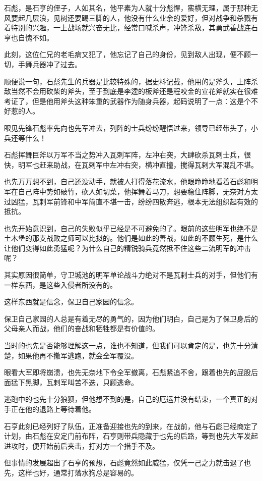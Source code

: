 \begin{multicols}{\theparacolNo}
石彪，是石亨的侄子，人如其名，他平素为人就十分彪悍，蛮横无理，属于那种无风要起几层浪，见树还要踢三脚的人，他没有什么业余的爱好，但对战争和杀戮有着特别的兴趣，一上战场就兴奋无比，经常口喊杀声，冲锋杀敌，其勇武善战连石亨也自愧不如。

此刻，这位仁兄的老毛病又犯了，他忘记了自己的身份，见到敌人出现，便不顾一切，手舞兵器冲了过去。

顺便说一句，石彪先生的兵器是比较特殊的，据史料记载，他用的是斧头，上阵杀敌当然不会用砍柴的斧头，至于到底是李逵的板斧还是程咬金的宣花斧就实在很难考证了，但是他用斧头这种笨重的武器作为随身兵器，起码说明了一点：这是个不好惹的人。

眼见先锋石彪率先向也先军冲去，列阵的士兵纷纷醒悟过来，领导已经带头了，小兵还等什么！

石彪挥舞巨斧以万军不当之势冲入瓦剌军阵，左冲右突，大肆砍杀瓦剌士兵，很快，明军也赶来助战，在瓦剌军中左冲右突，横冲直撞，搅得瓦剌大军混乱不堪。

也先万万想不到，自己还没动手，就被人打得落花流水，他眼睁睁地看着石彪和明军在自己阵中势如破竹，砍人如切菜，他挥舞着马刀，想要稳住阵脚，无奈对方太过凶猛，瓦剌军前锋和中军简直不堪一击，纷纷四散奔逃，根本无法组织起有效的抵抗。

也先开始意识到，自己的失败似乎已经是不可避免的了。眼前的这些明军也绝不是土木堡的那支战败之师可以比拟的。他们是如此的善战，如此的不顾生死，是什么让他们变得如此勇猛呢？为什么自己的精锐骑兵竟然抵不住这些二流明军的冲击呢？

其实原因很简单，守卫城池的明军单论战斗力绝对不是瓦剌士兵的对手，但他们有一样东西，是这些入侵者所没有的。

这样东西就是信念，保卫自己家园的信念。

保卫自己家园的人总是有着无尽的勇气的，因为他们明白，自己是为了保卫身后的父母亲人而战，他们的奋战和牺牲都是有价值的。

当时的也先是否能够理解这一点，谁也不知道，但我们可以肯定的是，也先十分清楚，如果他再不撤军逃跑，就会全军覆没。

眼看大军即将崩溃，也先无奈地下令全军撤离，石彪紧追不舍，跟着也先的屁股后面猛下黑脚，瓦剌军叫苦不迭，只顾逃命。

逃跑中的也先十分狼狈，但他想不到的是，自己的厄运并没有结束，一个真正的对手正在他的退路上等待着他。

石亨此刻已经列好了队伍，正准备迎接也先的到来，在战前，他与石彪已经商定了计划，由石彪在安定门前布阵，石亨则带兵隐藏于也先的后路，等到也先大军发起进攻时，便开始前后夹击，打对方一个措手不及。

但事情的发展超出了石亨的预想，石彪竟然如此威猛，仅凭一己之力就击退了也先，这样也好，通常打落水狗总是容易的。


\end{multicols}
